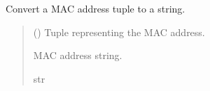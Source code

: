 \documentclass[letterpaper,10pt,english]{sphinxmanual}
\begin{document}

\begin{fulllineitems}
\label{\detokenize{cplddocs:config_ip.nuple2mac}}
\pysigstartsignatures
{}
\pysigstopsignatures
\sphinxAtStartPar
Convert a MAC address tuple to a string.
\begin{quote}\begin{description}
\sphinxAtStartPar
{} () \textendash{} Tuple representing the MAC address.

\sphinxAtStartPar
MAC address string.

\sphinxAtStartPar
str

\end{description}\end{quote}

\end{fulllineitems}

\end{document}
